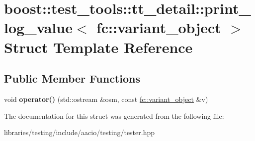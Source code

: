 \hypertarget{structboost_1_1test__tools_1_1tt__detail_1_1print__log__value_3_01fc_1_1variant__object_01_4}{}\section{boost\+:\+:test\+\_\+tools\+:\+:tt\+\_\+detail\+:\+:print\+\_\+log\+\_\+value$<$ fc\+:\+:variant\+\_\+object $>$ Struct Template Reference}
\label{structboost_1_1test__tools_1_1tt__detail_1_1print__log__value_3_01fc_1_1variant__object_01_4}
\subsection*{Public Member Functions}
\begin{DoxyCompactItemize}
\item 
\mbox{\label{structboost_1_1test__tools_1_1tt__detail_1_1print__log__value_3_01fc_1_1variant__object_01_4_abc295b8a9fbf3e3c35d6ed467bac0879}} 
void {\bfseries operator()} (std\+::ostream \&osm, const \mbox{\hyperlink{classfc_1_1variant__object}{fc\+::variant\+\_\+object}} \&v)
\end{DoxyCompactItemize}


The documentation for this struct was generated from the following file\+:\begin{DoxyCompactItemize}
\item 
libraries/testing/include/aacio/testing/tester.\+hpp\end{DoxyCompactItemize}

